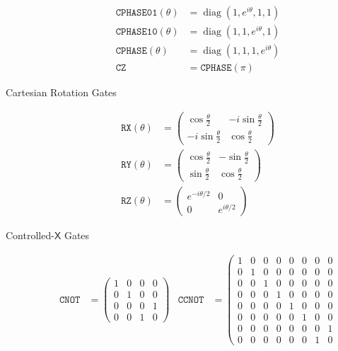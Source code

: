 \documentclass[conference]{IEEEtran}
\newcommand{\diag}{\mathop{\mathrm{diag}}\nolimits}
\begin{document}
\begin{description}
\begin{align*}
\texttt{CPHASE01}(\theta) &= \diag(1,e^{i\theta},1,1) \\
\texttt{CPHASE10}(\theta) &= \diag(1,1,e^{i\theta},1) \\
\texttt{CPHASE}(\theta) &= \diag(1,1,1,e^{i\theta}) \\
\texttt{CZ} &= \texttt{CPHASE}(\pi)
\end{align*}
\item[Cartesian Rotation Gates]
\begin{align*}
\texttt{RX}(\theta) &= \left(\begin{smallmatrix}
\cos\frac{\theta}{2} & -i\sin\frac{\theta}{2}\\
-i\sin\frac{\theta}{2} & \cos\frac{\theta}{2}
\end{smallmatrix}\right)\\
\texttt{RY}(\theta) &= \left(\begin{smallmatrix}
\cos\frac{\theta}{2} & -\sin\frac{\theta}{2}\\
\sin\frac{\theta}{2} & \cos\frac{\theta}{2}
\end{smallmatrix}\right)\\
\texttt{RZ}(\theta) &= \left(\begin{smallmatrix}
e^{-i\theta/2} & 0\\
0 & e^{i\theta/2}
\end{smallmatrix}\right)
\end{align*}
\item[Controlled-$\mathsf{X}$ Gates]
\begin{align*}
\texttt{CNOT} &=
\left(
\begin{smallmatrix}
1 & 0 & 0 & 0\\
0 & 1 & 0 & 0\\
0 & 0 & 0 & 1\\
0 & 0 & 1 & 0
\end{smallmatrix}
\right) &
\texttt{CCNOT} &=
\left(
\begin{smallmatrix}
    1 & 0 & 0 & 0 & 0 & 0 & 0 & 0\\
    0 & 1 & 0 & 0 & 0 & 0 & 0 & 0\\
    0 & 0 & 1 & 0 & 0 & 0 & 0 & 0\\
    0 & 0 & 0 & 1 & 0 & 0 & 0 & 0\\
    0 & 0 & 0 & 0 & 1 & 0 & 0 & 0\\
    0 & 0 & 0 & 0 & 0 & 1 & 0 & 0\\
    0 & 0 & 0 & 0 & 0 & 0 & 0 & 1\\
    0 & 0 & 0 & 0 & 0 & 0 & 1 & 0
\end{smallmatrix}

\end{align*}
\end{description}
\end{document}
